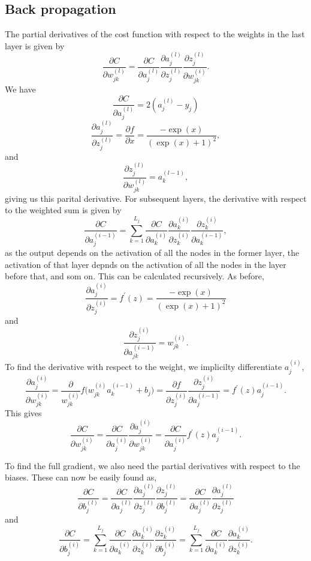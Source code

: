 \subsection*{Back propagation}
The partial derivatives of the cost function with respect to the weights in the last layer is given by
$$
    \frac{\partial C}{\partial w^{(l)}_{jk}} = \frac{\partial C}{\partial a^{(l)}_{j}} 
    \frac{\partial a^{(l)}_{j}}{\partial z^{(l)}_{j}} \frac{\partial z^{(l)}_{j}}{\partial w^{(i)}_{jk}}.
$$
We have
$$
    \frac{\partial C}{\partial a^{(l)}_{j}} = 2(a^{(l)}_{j} - y_j) 
$$
$$
    \frac{\partial a^{(l)}_{j}}{\partial z^{(l)}_{j}} = \frac{\partial f}{\partial x} = \frac{-\exp(x)}{(\exp(x) + 1)^2},
$$
and
$$
\frac{\partial z^{(l)}_{j}}{\partial w^{(l)}_{jk}} = a^{(l - 1)}_k,
$$
giving us this parital derivative. For subsequent layers, the derivative with respect to the weighted sum is given by
$$
    \frac{\partial C}{\partial a^{(i - 1)}_{j}} = \sum_{k = 1}^{L_j}\frac{\partial C}{\partial a^{(i)}_{k}} 
    \frac{\partial a^{(i)}_{k}}{\partial z^{(i)}_{k}} \frac{\partial z^{(i)}_{k}}{\partial a^{(i -1)}_{k}},
$$
as the output depends on the activation of all the nodes in the former layer, the activation of that layer depnds on the activation of all the nodes in the layer before that, and som on. 
This can be calculated recursively. As before,
$$
    \frac{\partial a^{(i)}_{j}}{\partial z^{(i)}_{j}} = f^\prime (z) = \frac{-\exp(x)}{(\exp(x) + 1)^2}
$$
and
$$
    \frac{\partial z^{(i)}_{j}}{\partial a^{(i - 1)}_{jk}} = w^{(i)}_{jk}.
$$
To find the derivative with respect to the weight, we implicilty differentiate $a^{(i)}_{j}$,
$$ 
    \frac{\partial a^{(i)}_{j}}{\partial w^{(i)}_{jk}} = \frac{\partial}{w^{(i)}_{jk}}f\big(w^{(i)}_{jk} a^{(i-1)}_k + b_j \big) = \frac{\partial f}{ \partial z^{(i)}_{j}} \frac{\partial z^{(i)}_{j}}{ \partial a^{(i-1)}_{j}} = f^\prime (z)a^{(i-1)}_{j}.
$$
This gives
$$
    \frac{\partial C}{\partial w^{(i)}_{jk}} = \frac{\partial C}{\partial a^{(i)}_{j}} \frac{\partial a^{(i)}_{j}}{\partial w^{(i)}_{jk}} = \frac{\partial C}{\partial a^{(i)}_{j}} f^\prime (z)a^{(i-1)}_{j}.
$$

To find the full gradient, we also need the partial derivatives with respect to the biases. These can now be easily found as,
$$
    \frac{\partial C}{\partial b^{(l)}_{j}} = \frac{\partial C}{\partial a^{(l)}_{j}} 
    \frac{\partial a^{(l)}_{j}}{\partial z^{(l)}_{j}} \frac{\partial z^{(l)}_{j}}{\partial b^{(l)}_{j}} = \frac{\partial C}{\partial a^{(l)}_{j}} \frac{\partial a^{(l)}_{j}}{\partial z^{(l)}_{j}}
$$
and
$$
    \frac{\partial C}{\partial b^{(i)}_{j}} = \sum_{k = 1}^{L_j}\frac{\partial C}{\partial a^{(i)}_{k}} 
    \frac{\partial a^{(i)}_{k}}{\partial z^{(i)}_{k}} \frac{\partial z^{(i)}_{k}}{\partial b^{(i)}_{j}} = \sum_{k = 1}^{L_j}\frac{\partial C}{\partial a^{(i)}_{k}}
    \frac{\partial a^{(i)}_{k}}{\partial z^{(i)}_{k}}.
$$


